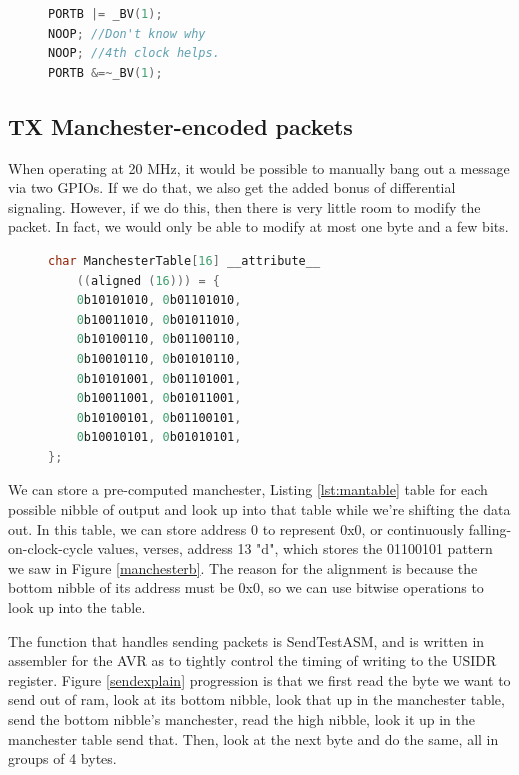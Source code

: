 \documentclass{article}
\begin{document}
\begin{figure}
\begin{lstlisting}[caption=NLP Code\label{lst:nlp_code},language=C, frame=single]
PORTB |= _BV(1);
NOOP; //Don't know why
NOOP; //4th clock helps.
PORTB &=~_BV(1);
\end{lstlisting}
\end{figure}

\subsection{TX Manchester-encoded packets}
When operating at 20 MHz, it would be possible to manually bang out a message
via two GPIOs.  If we do that, we also get the added bonus of differential
signaling.  However, if we do this, then there is very little room to modify
the packet.  In fact, we would only be able to modify at most one byte and a
few bits.


\begin{figure}
\begin{lstlisting}[caption=Manchester Lookup Table\label{lst:mantable},language=C, frame=single]
char ManchesterTable[16] __attribute__
	((aligned (16))) = {
	0b10101010, 0b01101010,
	0b10011010, 0b01011010,
	0b10100110, 0b01100110,
	0b10010110, 0b01010110,
	0b10101001, 0b01101001,
	0b10011001, 0b01011001,
	0b10100101, 0b01100101,
	0b10010101, 0b01010101,
};
\end{lstlisting}
\end{figure}

We can store a pre-computed manchester, Listing \ref{lst:mantable} table for each possible nibble of output
and look up into that table while we're shifting the data out.  In this table, we can store
address 0 to represent 0x0, or continuously falling-on-clock-cycle values, verses, address 13 "d", which
stores the 01100101 pattern we saw in Figure \ref{manchesterb}.  The reason for the alignment
is because the bottom nibble of its address must be 0x0, so we can use bitwise operations to look up
into the table.

The function that handles sending packets is SendTestASM, and is written in assembler for the AVR as
to tightly control the timing of writing to the USIDR register.  Figure \ref{sendexplain} progression is that we first
read the byte we want to send out of ram, look at its bottom nibble, look that up in the manchester
table, send the bottom nibble's manchester, read the high nibble, look it up in the manchester table
send that.  Then, look at the next byte and do the same, all in groups of 4 bytes.
\end{document}

